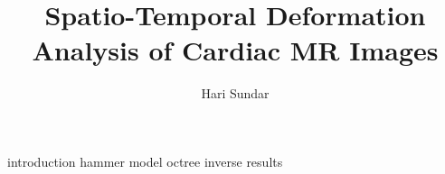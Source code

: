 \documentclass{upenndiss}
\title{Spatio-Temporal Deformation Analysis of Cardiac MR Images}
\author{Hari Sundar}
\numberwithin{equation}{section}
\begin{document}
\FrontMatter

 {introduction}
 {hammer}
 {model}
 {octree}
 {inverse}
 {results}	     




\end{document}
